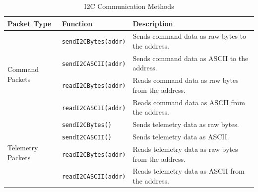 \begin{table}[h]
	\centering
	\caption{I2C Communication Methods}
	\begin{tabular}{|l|l|l|}
		\hline
		\textbf{Packet Type} & \textbf{Function} & \textbf{Description} \\ \hline
		\multirow{4}{*}{Command Packets} & \texttt{sendI2CBytes(addr)} & Sends command data as raw bytes to the address. \\ \cline{2-3}
		& \texttt{sendI2CASCII(addr)} & Sends command data as ASCII to the address. \\ \cline{2-3}
		& \texttt{readI2CBytes(addr)} & Reads command data as raw bytes from the address. \\ \cline{2-3}
		& \texttt{readI2CASCII(addr)} & Reads command data as ASCII from the address. \\ \hline
		\multirow{4}{*}{Telemetry Packets} & \texttt{sendI2CBytes()} & Sends telemetry data as raw bytes. \\ \cline{2-3}
		& \texttt{sendI2CASCII()} & Sends telemetry data as ASCII. \\ \cline{2-3}
		& \texttt{readI2CBytes(addr)} & Reads telemetry data as raw bytes from the address. \\ \cline{2-3}
		& \texttt{readI2CASCII(addr)} & Reads telemetry data as ASCII from the address. \\ \hline
	\end{tabular}
	\label{tab:i2c_methods}
\end{table}


